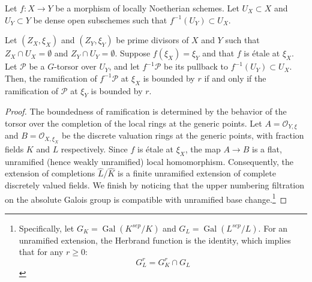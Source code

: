 \begin{lemma}\label{lemma:descend_ramification_along_etale}

Let $f: X \to Y$ be a morphism of locally Noetherian schemes. Let $U_X \subset X$ and $U_Y \subset Y$ be dense open subschemes such that $f^{-1}(U_Y) \subset U_X$.

Let $(Z_X, \xi_X)$ and $(Z_Y, \xi_Y)$ be prime divisors of $X$ and $Y$ such that $Z_X \cap U_X = \emptyset$ and $Z_Y \cap U_Y = \emptyset$.
Suppose $f(\xi_X) = \xi_Y$ and that $f$ is étale at $\xi_X$.
Let $\mathcal{P}$ be a $G$-torsor over $U_Y$, and let $f^{-1} \mathcal{P}$ be its pullback to $f^{-1}(U_Y) \subset U_X$.
Then, the ramification of $f^{-1} \mathcal{P}$ at $\xi_X$ is bounded by $r$ if and only if the ramification of $\mathcal{P}$ at $\xi_Y$ is bounded by $r$.
\end{lemma}
\begin{proof}
The boundedness of ramification is determined by the behavior of the torsor over the completion of the local rings at the generic points.
Let $A = \mathcal{O}_{Y, \xi}$ and $B = \mathcal{O}_{X, \xi_X}$ be the discrete valuation rings at the generic points, with fraction fields
$K$ and $L$ respectively. Since $f$ is étale at $\xi_X$, the map $A \to B$ is a flat, unramified (hence weakly unramified) local homomorphism.
Consequently, the extension of completions $\widehat{L} / \widehat{K}$ is a finite unramified extension of complete discretely valued fields.
We finish by noticing that the upper numbering filtration on the absolute Galois group is compatible with unramified base change.\footnote{
 Specifically, let $G_K = \operatorname{Gal}(K^{sep}/K)$ and $G_L = \operatorname{Gal}(L^{sep}/L)$. For an unramified extension, the Herbrand function is the identity, which implies that for any $r \geq 0$:
\[ G_L^r = G_K^r \cap G_L \]}
\end{proof}


